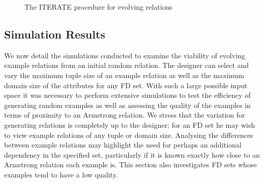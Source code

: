 {\line
\begin{figure}[ht]
\begin{center}
\end{center}
\caption{\label{numdep:fig:iterate} The ITERATE procedure for
evolving relations}
\end{figure}
}

\subsection{Simulation Results}


We now detail the simulations conducted to examine the
viability of evolving example relations from an initial
random relation. The designer can select and vary the maximum tuple size
of an example relation as well as the maximum domain size of the
attributes for any 
FD set. With such a large possible input space it was necessary to
 perform extensive simulations to test
the efficiency of generating random examples as well as assessing
the quality of the examples in terms of proximity to an Armstrong 
relation. We stress that the
variation for generating relations is completely up to the
designer; for an FD set he may wish to view example relations
of any tuple or domain size. Analysing the differences between example relations
 may highlight the need for perhaps
an additional dependency in the specified set, particularly if it
is known exactly how close to an Armstrong relation each example is. 
This section
also investigates FD sets whose examples tend to have a low
quality.

